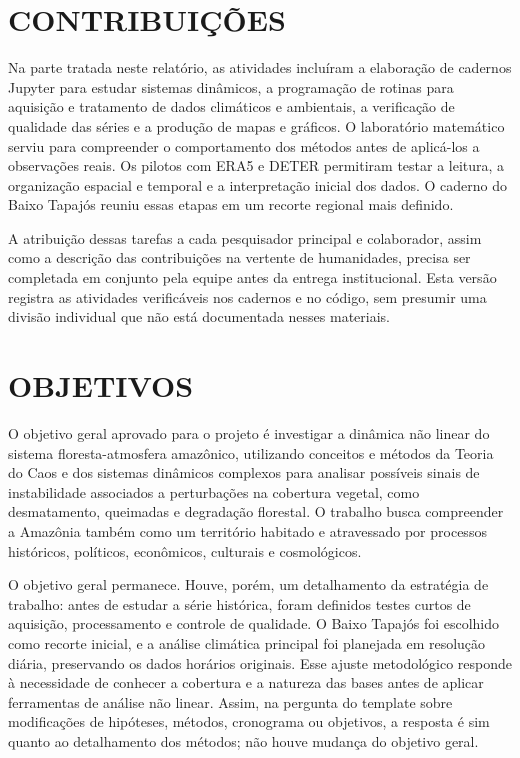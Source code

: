 \documentclass[12pt,a4paper]{article}
\begin{document}
\section*{CONTRIBUIÇÕES}

Na parte tratada neste relatório, as atividades incluíram a elaboração de cadernos Jupyter para estudar sistemas dinâmicos, a programação de rotinas para aquisição e tratamento de dados climáticos e ambientais, a verificação de qualidade das séries e a produção de mapas e gráficos. O laboratório matemático serviu para compreender o comportamento dos métodos antes de aplicá-los a observações reais. Os pilotos com ERA5 e DETER permitiram testar a leitura, a organização espacial e temporal e a interpretação inicial dos dados. O caderno do Baixo Tapajós reuniu essas etapas em um recorte regional mais definido.

A atribuição dessas tarefas a cada pesquisador principal e colaborador, assim como a descrição das contribuições na vertente de humanidades, precisa ser completada em conjunto pela equipe antes da entrega institucional. Esta versão registra as atividades verificáveis nos cadernos e no código, sem presumir uma divisão individual que não está documentada nesses materiais.


\section*{OBJETIVOS}

O objetivo geral aprovado para o projeto é investigar a dinâmica não linear do sistema floresta-atmosfera amazônico, utilizando conceitos e métodos da Teoria do Caos e dos sistemas dinâmicos complexos para analisar possíveis sinais de instabilidade associados a perturbações na cobertura vegetal, como desmatamento, queimadas e degradação florestal. O trabalho busca compreender a Amazônia também como um território habitado e atravessado por processos históricos, políticos, econômicos, culturais e cosmológicos.

O objetivo geral permanece. Houve, porém, um detalhamento da estratégia de trabalho: antes de estudar a série histórica, foram definidos testes curtos de aquisição, processamento e controle de qualidade. O Baixo Tapajós foi escolhido como recorte inicial, e a análise climática principal foi planejada em resolução diária, preservando os dados horários originais. Esse ajuste metodológico responde à necessidade de conhecer a cobertura e a natureza das bases antes de aplicar ferramentas de análise não linear. Assim, na pergunta do template sobre modificações de hipóteses, métodos, cronograma ou objetivos, a resposta é sim quanto ao detalhamento dos métodos; não houve mudança do objetivo geral.
\end{document}

